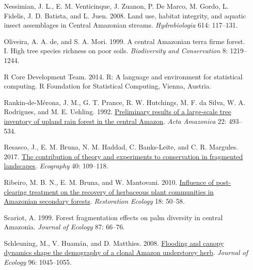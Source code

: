 \documentclass[
  12pt,
  man, donotrepeattitle,floatsintext]{apa6}
\newlength{\cslhangindent}
\newlength{\cslentryspacingunit} %
\newenvironment{CSLReferences}[2] %
 {%
  \setlength{\parindent}{0pt}
  \ifodd #1
  \let\oldpar\par
  \def\par{\hangindent=\cslhangindent\oldpar}
  \fi
  \setlength{\parskip}{#2\cslentryspacingunit}
 }%
 {}
\begin{document}
\begin{CSLReferences}{1}{0}
\leavevmode{}%
Nessimian, J. L., E. M. Venticinque, J. Zuanon, P. De Marco, M. Gordo, L. Fidelis, J. D. Batista, and L. Juen. 2008. Land use, habitat integrity, and aquatic insect assemblages in {Central} {Amazonian} streams. \emph{Hydrobiologia} 614: 117--131.

\leavevmode{}%
Oliveira, A. A. de, and S. A. Mori. 1999. A central {Amazonian} terra firme forest. {I}. {High} tree species richness on poor soils. \emph{Biodiversity and Conservation} 8: 1219--1244.

\leavevmode{}%
R Core Development Team. 2014. R: {A} language and environment for statistical computing. R Foundation for Statistical Computing, Vienna, Austria.

\leavevmode{}%
Rankin-de-Mérona, J. M., G. T. Prance, R. W. Hutchings, M. F. da Silva, W. A. Rodrigues, and M. E. Uehling. 1992. \href{https://doi.org/10.1590/1809-43921992224534}{Preliminary results of a large-scale tree inventory of upland rain forest in the central {Amazon}}. \emph{Acta Amazonica} 22: 493--534.

\leavevmode{}%
Resasco, J., E. M. Bruna, N. M. Haddad, C. Banks-Leite, and C. R. Margules. 2017. \href{https://doi.org/10.1111/ecog.02546}{The contribution of theory and experiments to conservation in fragmented landscapes}. \emph{Ecography} 40: 109--118.

\leavevmode{}%
Ribeiro, M. B. N., E. M. Bruna, and W. Mantovani. 2010. \href{https://doi.org/10.1111/j.1526-100X.2010.00715.x}{Influence of post-clearing treatment on the recovery of herbaceous plant communities in {Amazonian} secondary forests}. \emph{Restoration Ecology} 18: 50--58.

\leavevmode{}%
Scariot, A. 1999. Forest fragmentation effects on palm diversity in central {Amazonia}. \emph{Journal of Ecology} 87: 66--76.

\leavevmode{}%
Schleuning, M., V. Huamán, and D. Matthies. 2008. \href{https://doi.org/10.1111/j.1365-2745.2008.01416.x}{Flooding and canopy dynamics shape the demography of a clonal {Amazon} understorey herb}. \emph{Journal of Ecology} 96: 1045--1055.


\end{CSLReferences}
\end{document}
